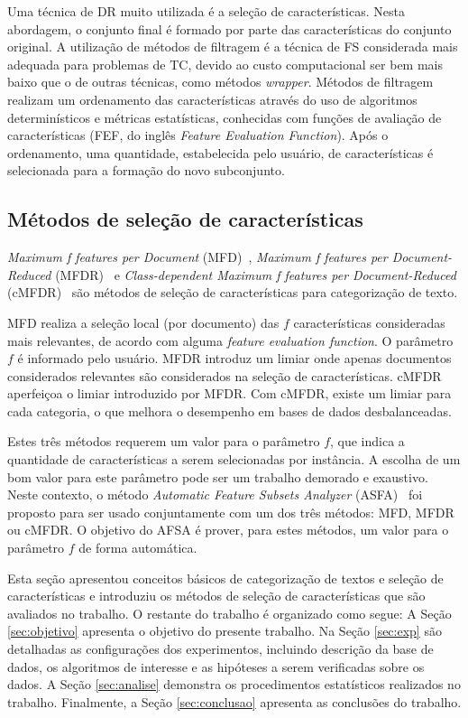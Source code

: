 \documentclass[conference]{IEEEtran}
\begin{document}
Uma técnica de DR muito utilizada é a seleção de características. Nesta abordagem, o conjunto final é formado por parte das características do conjunto original. A utilização de métodos de filtragem é a técnica de FS considerada mais adequada para problemas de TC, devido ao custo computacional ser bem mais baixo que o de outras técnicas, como métodos \emph{wrapper}. Métodos de filtragem realizam um ordenamento das características através do uso de algoritmos determinísticos e métricas estatísticas, conhecidas com funções de avaliação de características (FEF, do inglês \emph{Feature Evaluation Function}). Após o ordenamento, uma quantidade, estabelecida pelo usuário, de características é selecionada para a formação do novo subconjunto.

\subsection{Métodos de seleção de características}
\label{sec:metodos}

\textit{Maximum f features per Document} (MFD)~\cite{mfd2014}, \textit{Maximum f features per Document-Reduced} (MFDR)~\cite{mfd2014} e \textit{Class-dependent Maximum f features per Document-Reduced} (cMFDR)~\cite{fragoso2016cmfdr} são métodos de seleção de características para categorização de texto.

MFD realiza a seleção local (por documento) das $f$ características consideradas mais relevantes, de acordo com alguma \textit{feature evaluation function}. O parâmetro $f$ é informado pelo usuário. MFDR introduz um limiar onde apenas documentos considerados relevantes são considerados na seleção de características. cMFDR aperfeiçoa o limiar introduzido por MFDR. Com cMFDR, existe um limiar para cada categoria, o que melhora o desempenho em bases de dados desbalanceadas.

Estes três métodos requerem um valor para o parâmetro $f$, que indica a quantidade de características a serem selecionadas por instância.
A escolha de um bom valor para este parâmetro pode ser um trabalho demorado e exaustivo.
Neste contexto, o método \textit{Automatic Feature Subsets Analyzer} (ASFA)~\cite{fragoso2016afsa} foi proposto para ser usado conjuntamente com um dos três métodos: MFD, MFDR ou cMFDR.
O objetivo do AFSA é prover, para estes métodos, um valor para o parâmetro $f$ de forma automática.

Esta seção apresentou conceitos básicos de categorização de textos e seleção de características e introduziu os métodos de seleção de características que são avaliados no trabalho. 
O restante do trabalho é organizado como segue: 
A Seção \ref{sec:objetivo} apresenta o objetivo do presente trabalho. 
Na Seção \ref{sec:exp} são detalhadas as configurações dos experimentos, incluindo descrição da base de dados, os algoritmos de interesse e as hipóteses a serem verificadas sobre os dados. 
A Seção \ref{sec:analise} demonstra os procedimentos estatísticos realizados no trabalho.
Finalmente, a Seção \ref{sec:conclusao} apresenta as conclusões do trabalho.
\end{document}
